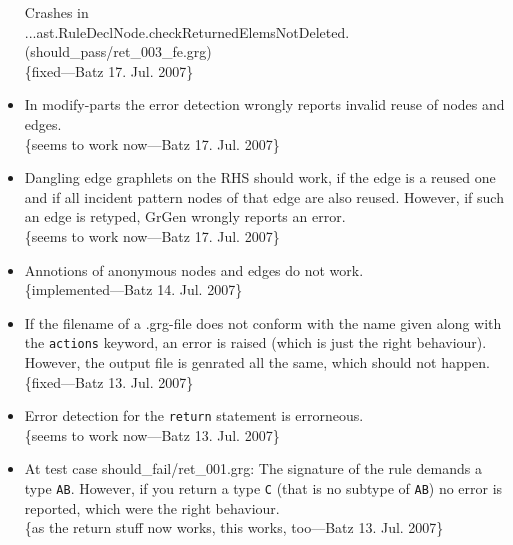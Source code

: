 \documentclass[12pt,a4paper]{article}
\begin{document}
\begin{itemize}
		Crashes in\\
		...ast.RuleDeclNode.checkReturnedElemsNotDeleted.\\
		(should\_pass/ret\_003\_fe.grg)\\
		\{fixed---Batz 17. Jul. 2007\}
	\item In modify-parts the error detection wrongly reports invalid reuse of nodes and edges.\\
		\{seems to work now---Batz 17. Jul. 2007\}
	\item Dangling edge graphlets on the RHS should work, if the edge is a reused one and if all incident pattern nodes of that edge are also reused.
    However, if such an edge is retyped, GrGen wrongly reports an error.\\
		\{seems to work now---Batz 17. Jul. 2007\}
	\item Annotions of anonymous nodes and edges do not work.\\
		\{implemented---Batz 14. Jul. 2007\}
	\item If the filename of a .grg-file does not conform with the name given along with the {\tt actions} keyword, an error is raised (which is just the right behaviour). However, the output file is genrated all the same, which should not happen.\\
    \{fixed---Batz 13. Jul. 2007\}
	\item Error detection for the {\tt return} statement is errorneous.\\
		\{seems to work now---Batz 13. Jul. 2007\}
	\item At test case should\_fail/ret\_001.grg:
  	The signature of the rule demands a type {\tt AB}.
	However, if you return a type {\tt C} (that is no subtype of {\tt AB}) no error is reported, which were the right behaviour.\\
		\{as the return stuff now works, this works, too---Batz 13. Jul. 2007\}
\end{itemize}
\end{document}
